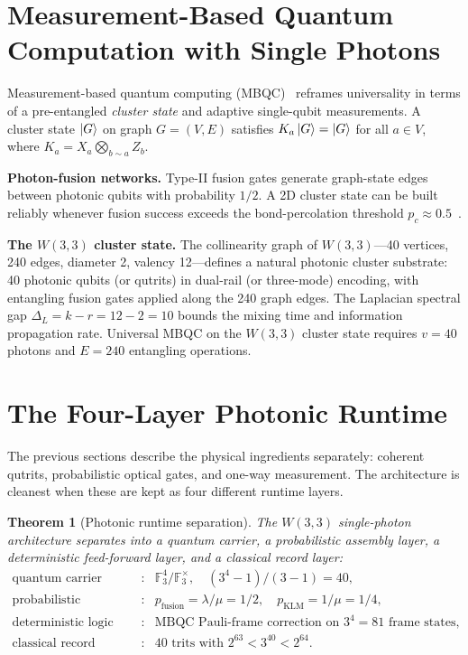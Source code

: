﻿\documentclass[12pt]{article}
\newtheorem{theorem}{Theorem}[section]
\newcommand{\GF}[1]{\mathbb{F}_{#1}}
\begin{document}
\section{Measurement-Based Quantum Computation with Single Photons}
\label{sec:mbqc}

Measurement-based quantum computing (MBQC)~\cite{Raussendorf2001} reframes
universality in terms of a pre-entangled \emph{cluster state} and adaptive
single-qubit measurements.  A cluster state $\ket{G}$ on graph $G=(V,E)$ satisfies
$K_a\ket{G} = \ket{G}$ for all $a\in V$, where $K_a = X_a \bigotimes_{b\sim a} Z_b$.

\textbf{Photon-fusion networks.}  Type-II fusion gates generate graph-state edges
between photonic qubits with probability $1/2$.  A 2D cluster state can be built
reliably whenever fusion success exceeds the bond-percolation threshold
$p_c \approx 0.5$~\cite{Browne2005}.

\textbf{The $W(3,3)$ cluster state.}  The collinearity graph of $W(3,3)$---40
vertices, 240 edges, diameter 2, valency 12---defines a natural photonic cluster
substrate: 40 photonic qubits (or qutrits) in dual-rail (or three-mode) encoding,
with entangling fusion gates applied along the 240 graph edges.  The Laplacian
spectral gap $\Delta_L = k - r = 12 - 2 = 10$ bounds the mixing time and information
propagation rate.  Universal MBQC on the $W(3,3)$ cluster state requires $v = 40$
photons and $E = 240$ entangling operations.

\section{The Four-Layer Photonic Runtime}
\label{sec:runtime}

The previous sections describe the physical ingredients separately: coherent
qutrits, probabilistic optical gates, and one-way measurement.  The architecture is
cleanest when these are kept as four different runtime layers.

\begin{theorem}[Photonic runtime separation]
\label{thm:runtime}
The $W(3,3)$ single-photon architecture separates into a quantum carrier, a
probabilistic assembly layer, a deterministic feed-forward layer, and a classical
record layer:
\[
\begin{array}{ccl}
\text{quantum carrier} &:& \GF{3}^{4}/\GF{3}^{\times},\quad
  (3^4-1)/(3-1)=40,\\
\text{probabilistic assembly} &:& p_{\mathrm{fusion}}=\lambda/\mu=1/2,\quad
  p_{\mathrm{KLM}}=1/\mu=1/4,\\
\text{deterministic logic} &:& \text{MBQC Pauli-frame correction on }3^4=81
  \text{ frame states},\\
\text{classical record} &:& 40\text{ trits with }2^{63}<3^{40}<2^{64}.
\end{array}
\]
\end{theorem}
\end{document}
